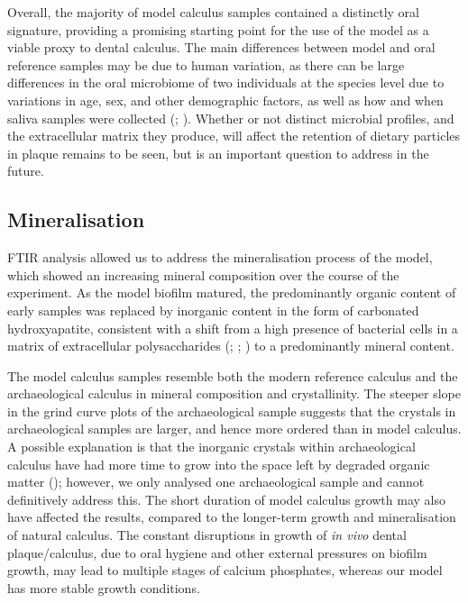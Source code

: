 \documentclass[
  b5paper,
]{book}
\begin{document}
Overall, the majority of model calculus samples contained a distinctly
oral signature, providing a promising starting point for the use of the
model as a viable proxy to dental calculus. The main differences between
model and oral reference samples may be due to human variation, as there
can be large differences in the oral microbiome of two individuals at
the species level due to variations in age, sex, and other demographic
factors, as well as how and when saliva samples were collected
(;
).
Whether or not distinct microbial profiles, and the extracellular matrix
they produce, will affect the retention of dietary particles in plaque
remains to be seen, but is an important question to address in the
future.

\subsection{Mineralisation}\label{mineralisation}

FTIR analysis allowed us to address the mineralisation process of the
model, which showed an increasing mineral composition over the course of
the experiment. As the model biofilm matured, the predominantly organic
content of early samples was replaced by inorganic content in the form
of carbonated hydroxyapatite, consistent with a shift from a high
presence of bacterial cells in a matrix of extracellular polysaccharides
(;
;
)
to a predominantly mineral content.

The model calculus samples resemble both the modern reference calculus
and the archaeological calculus in mineral composition and
crystallinity. The steeper slope in the grind curve plots of the
archaeological sample suggests that the crystals in archaeological
samples are larger, and hence more ordered than in model calculus. A
possible explanation is that the inorganic crystals within
archaeological calculus have had more time to grow into the space left
by degraded organic matter
(); however,
we only analysed one archaeological sample and cannot definitively
address this. The short duration of model calculus growth may also have
affected the results, compared to the longer-term growth and
mineralisation of natural calculus. The constant disruptions in growth
of \emph{in vivo} dental plaque/calculus, due to oral hygiene and other
external pressures on biofilm growth, may lead to multiple stages of
calcium phosphates, whereas our model has more stable growth conditions.
\end{document}
